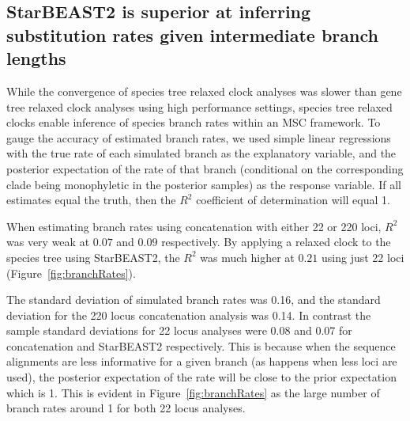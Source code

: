 \documentclass[nogrid]{MBE}%
\begin{document}
\subsection{StarBEAST2 is superior at inferring substitution rates given intermediate branch lengths}

While the convergence of species tree relaxed clock analyses was slower than
gene tree relaxed clock analyses using high performance settings, species tree
relaxed clocks enable inference of species branch rates within an MSC framework.
To gauge the accuracy of estimated branch rates, we used simple linear
regressions with the true rate of each simulated branch as the explanatory
variable, and the posterior expectation of the rate of that branch (conditional
on the corresponding clade being monophyletic in the posterior samples) as the
response variable. If all estimates equal the truth, then the $R^2$ coefficient
of determination will equal 1.

When estimating branch rates using concatenation with either 22 or 220 loci,
$R^2$ was very weak at $0.07$ and $0.09$ respectively. By applying a relaxed
clock to the species tree using StarBEAST2, the $R^2$ was much higher at $0.21$
using just 22 loci (Figure~\ref{fig:branchRates}).

The standard deviation of simulated branch rates was 0.16, and the standard
deviation for the 220 locus concatenation analysis was 0.14. In contrast the
sample standard deviations for 22 locus analyses were 0.08 and 0.07 for
concatenation and StarBEAST2 respectively. This is because when the sequence
alignments are less informative for a given branch (as happens when less loci are
used), the posterior expectation of the rate will be close to the prior
expectation which is 1. This is evident in Figure~\ref{fig:branchRates} as the
large number of branch rates around 1 for both 22 locus analyses.
\end{document}

